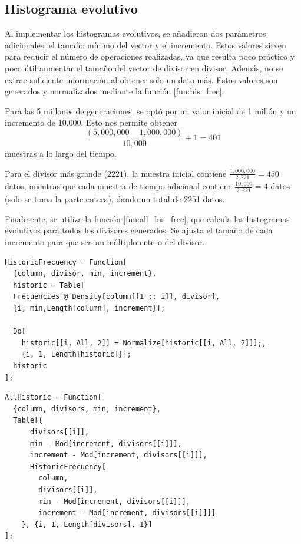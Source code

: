\documentclass[12pt,twoside]{article}
\begin{document}
	\subsection{Histograma evolutivo}
	
	Al implementar los histogramas evolutivos, se añadieron dos parámetros adicionales: el tamaño mínimo del vector y el incremento. Estos valores sirven para reducir el número de operaciones realizadas, ya que resulta poco práctico y poco útil aumentar el tamaño del vector de divisor en divisor. Además, no se extrae suficiente información al obtener solo un dato más. Estos valores son generados y normalizados mediante la función \ref{fun:his_frec}.  
	
	Para las 5 millones de generaciones, se optó por un valor inicial de 1 millón y un incremento de 10,000. Esto nos permite obtener  
	\[
	\frac{(5,000,000 - 1,000,000)}{10,000} + 1 = 401
	\]  
	muestras a lo largo del tiempo.  
	
	Para el divisor más grande ($2221$), la muestra inicial contiene  $\frac{1,000,000}{2,221} = 450$ datos, mientras que cada muestra de tiempo adicional contiene  $\frac{10,000}{2,221} = 4$ datos (solo se toma la parte entera), dando un total de 2251 datos.  
	
	Finalmente, se utiliza la función \ref{fun:all_his_frec}, que calcula los histogramas evolutivos para todos los divisores generados. Se ajusta el tamaño de cada incremento para que sea un múltiplo entero del divisor.  
	
\begin{lstlisting}[style=modernMathematica, label=fun:his_frec, caption={Calculo y normalización de frecuencias evolutivas}]
HistoricFrecuency = Function[
  {column, divisor, min, increment},
  historic = Table[
  Frecuencies @ Density[column[[1 ;; i]], divisor], 
  {i, min,Length[column], increment}];
  
  Do[
    historic[[i, All, 2]] = Normalize[historic[[i, All, 2]]];,
    {i, 1, Length[historic]}];
  historic
];
\end{lstlisting}


\begin{lstlisting}[style=modernMathematica, label=fun:all_his_frec, caption={Todos los histogramas evolutivos}]
AllHistoric = Function[
  {column, divisors, min, increment},
  Table[{
  	  divisors[[i]],
	  min - Mod[increment, divisors[[i]]],
	  increment - Mod[increment, divisors[[i]]],
	  HistoricFrecuency[
	    column, 
	    divisors[[i]], 
 	    min - Mod[increment, divisors[[i]]], 
	    increment - Mod[increment, divisors[[i]]]]
	}, {i, 1, Length[divisors], 1}]
];
\end{lstlisting}
\end{document}
